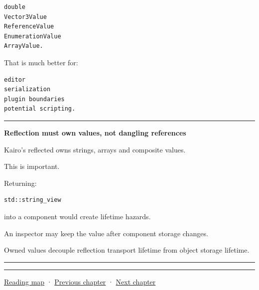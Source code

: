 \begin{verbatim}
double
Vector3Value
ReferenceValue
EnumerationValue
ArrayValue.
\end{verbatim}

That is much better for:

\begin{verbatim}
editor
serialization
plugin boundaries
potential scripting.
\end{verbatim}

\begin{center}\rule{0.5\linewidth}{0.5pt}\end{center}

\textbf{Reflection must own values, not dangling references}

Kairo's reflected  owns strings, arrays and composite values.

This is important.

Returning:

\begin{verbatim}
std::string_view
\end{verbatim}

into a component would create lifetime hazards.

An inspector may keep the value after component storage changes.

Owned values decouple reflection transport lifetime from object storage lifetime.

\begin{center}\rule{0.5\linewidth}{0.5pt}\end{center}

\begin{center}\rule{0.5\linewidth}{0.5pt}\end{center}

\hyperref[volume-reading-map]{Reading map} · \hyperref[05-engine-i-ch010-engine-changes-across-subsystem-contracts]{Previous chapter} · \hyperref[05-engine-i-ch012-transactions-recovery-and-safe-project-boundaries]{Next chapter}

